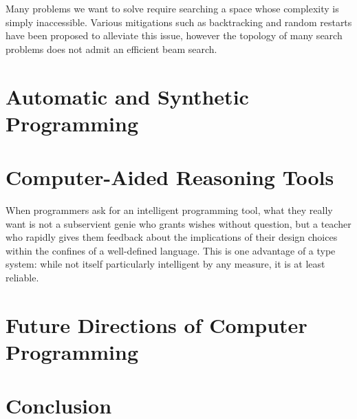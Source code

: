\documentclass[10pt]{article}
\begin{document}
Many problems we want to solve require searching a space whose complexity is simply inaccessible. Various mitigations such as backtracking and random restarts have been proposed to alleviate this issue, however the topology of many search problems does not admit an efficient beam search.

  \section{Automatic and Synthetic Programming}



  \section{Computer-Aided Reasoning Tools}

When programmers ask for an intelligent programming tool, what they really want is not a subservient genie who grants wishes without question, but a teacher who rapidly gives them feedback about the implications of their design choices within the confines of a well-defined language. This is one advantage of a type system: while not itself particularly intelligent by any measure, it is at least reliable.

  \section{Future Directions of Computer Programming}

  \section{Conclusion}

  
  
\end{document}
